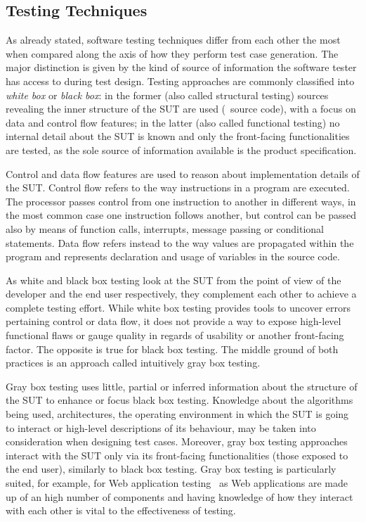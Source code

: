 \subsection{Testing Techniques}
As already stated, software testing techniques differ from each other the most
when compared along the axis of how they perform test case generation. The major
distinction is given by the kind of source of information the software tester
has access to during test design. Testing approaches are commonly classified
into \emph{white box} or \emph{black box}: in the former (also called structural
testing) sources revealing the inner structure of the \ac{SUT} are used
(\eg~source code), with a focus on data and control flow features; in the latter
(also called functional testing) no internal detail about the \ac{SUT} is known
and only the front-facing functionalities are tested, as the sole source of
information available is the product specification.

Control and data flow features are used to reason about implementation details
of the \ac{SUT}. Control flow refers to the way instructions in a program are
executed. The processor passes control from one instruction to another in
different ways, in the most common case one instruction follows another, but
control can be passed also by means of function calls, interrupts, message
passing or conditional statements. Data flow refers instead to the way values
are propagated within the program and represents declaration and usage of
variables in the source code.

As white and black box testing look at the \ac{SUT} from the point of view of
the developer and the end user respectively, they complement each other to
achieve a complete testing effort. While white box testing provides tools to
uncover errors pertaining control or data flow, it does not provide a way to
expose high-level functional flaws or gauge quality in regards of usability or
another front-facing factor. The opposite is true for black box testing. The
middle ground of both practices is an approach called intuitively gray box
testing.

Gray box testing uses little, partial or inferred information about the
structure of the \ac{SUT} to enhance or focus black box testing. Knowledge about
the algorithms being used, architectures, the operating environment in which the
\ac{SUT} is going to interact or high-level descriptions of its behaviour, may
be taken into consideration when designing test cases. Moreover, gray box
testing approaches interact with the \ac{SUT} only via its front-facing
functionalities (those exposed to the end user), similarly to black box testing.
Gray box testing is particularly suited, for example, for Web application
testing~\cite{nguyen2001testing, di2006testing} as Web applications are made up
of an high number of components and having knowledge of how they interact with
each other is vital to the effectiveness of testing.

